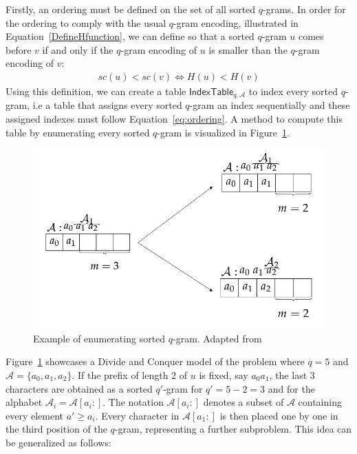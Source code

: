 \documentclass[twoside,a4paper,bsc]{master}
\newcommand{\Qgram}[1]{\(#1\)-gram}
\newcommand{\IT}[2]{\mathsf{IndexTable}_{#1,#2}}
\newcommand{\Alpha}[0]{\mathcal{A}}
\begin{document}
Firstly, an ordering must be defined on the set of all sorted \Qgram{q}s.
In
order for the ordering to comply with the usual \Qgram{q} encoding,
illustrated
in Equation~\ref{DefineHfunction}, we can define so
that a sorted \Qgram{q} \(u\) comes before \(v\) if and only if 
the \Qgram{q} encoding of \(u\) is smaller than the \Qgram{q} encoding of \(v\):
\begin{align}
sc(u) < sc(v)\Leftrightarrow H(u) < H(v)
\label{eq:ordering}
\end{align}
Using this definition, we can create a table \(\IT{q}{\Alpha}\) to index every sorted
\Qgram{q},
i.e a table that assigns every sorted \Qgram{q} an index sequentially and
these
assigned indexes must follow Equation~\ref{eq:ordering}. A method to
compute
this table by enumerating every sorted \Qgram{q} is visualized in
Figure~\ref{fig:enumerate}.

\begin{figure}[t]
\begin{center}
\includegraphics[scale=0.4]{graphics/multiset.png}
\end{center}
\caption{Example of enumerating sorted \Qgram{q}. Adapted from~\cite{pfn}}
\label{fig:enumerate}
\end{figure}

Figure~\ref{fig:enumerate} showcases a Divide and Conquer model of the problem 
where \(q=5\) and \(\Alpha=\{a_0,a_1,a_2\}\). If the prefix of length 2 of \(u\)
is fixed, say \(a_0a_1\), the last 3 characters are obtained as a sorted
\Qgram{q'} for \(q'=5-2=3\) and for the alphabet \(\Alpha_i=\Alpha[a_i:]\).
The notation \(\Alpha[a_i:]\) denotes a subset of \(\Alpha\) containing
every
element \(a' \geq a_i\). Every character in \(\Alpha[a_1:]\) is then placed one 
by one in the
third position of the \Qgram{q}, representing a further subproblem. This idea 
can be generalized as follows:
\end{document}
